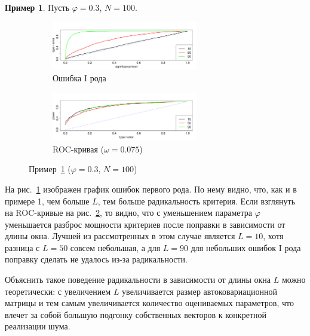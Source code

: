 \documentclass[specialist,
substylefile = spbu_report.rtx,
subf,href,colorlinks=true, 12pt]{disser}
\theoremstyle{definition}
\newtheorem{example}{Пример}
\begin{document}
\begin{example}\label{example2}
	Пусть $\varphi=0.3$, $N=100$.
	\begin{figure}[h!]
		\captionsetup[subfigure]{justification=Centering}
		\begin{subfigure}[t]{\textwidth}
			\centering
			\includegraphics[width=0.7\textwidth]{img/alphaI_phi3_N100}
			\caption{Ошибка I рода}
			\label{alphaI_phi3_N100}
		\end{subfigure}
		\begin{subfigure}[t]{\textwidth}
			\centering
			\includegraphics[width=0.7\textwidth]{img/roc_phi3_N100}
			\caption{ROC-кривая ($\omega=0.075$)}
			\label{roc_phi3_N100}
		\end{subfigure}
	\label{fig:example2}
	\caption{Пример~\ref{example2} ($\varphi=0.3$, $N=100$)}
	\end{figure}
	На рис.~\ref{alphaI_phi3_N100} изображен график ошибок первого рода. По нему видно, что, как и в примере 1, чем больше $L$, тем больше радикальность критерия. Если взглянуть на ROC-кривые на рис.~\ref{roc_phi3_N100}, то видно, что с уменьшением параметра $\varphi$ уменьшается разброс мощности критериев после поправки в зависимости от длины окна. Лучшей из рассмотренных в этом случае является $L=10$, хотя разница с $L=50$ совсем небольшая, а для $L=90$ для небольших ошибок I рода поправку сделать не удалось из-за радикальности.
\end{example}

Объяснить такое поведение радикальности в зависимости от длины окна $L$ можно теоретически: с увеличением $L$ увеличивается размер автоковариационной матрицы и тем самым увеличивается количество оцениваемых параметров, что влечет за собой большую подгонку собственных векторов к конкретной реализации шума.
\end{document}
